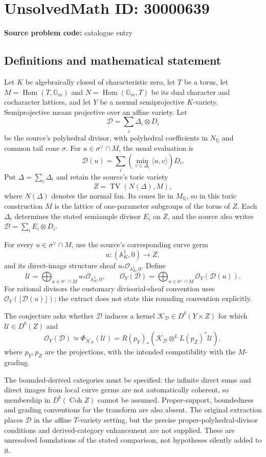 \documentclass[11pt]{article}
\newcommand{\Q}{\mathbb{Q}}
\begin{document}
\section*{UnsolvedMath ID: 30000639}
\textbf{Source problem code:} catalogue entry
\subsection{Definitions and mathematical statement}
Let $K$ be algebraically closed of characteristic zero, let $T$ be a torus, let $M=\operatorname{Hom}(T,\mathbb G_m)$ and $N=\operatorname{Hom}(\mathbb G_m,T)$ be its dual character and cocharacter lattices, and let $Y$ be a normal semiprojective $K$-variety. Semiprojective means projective over an affine variety. Let
\[
\mathcal D=\sum_i\Delta_i\otimes D_i
\]
be the source's polyhedral divisor, with polyhedral coefficients in $N_{\Q}$ and common tail cone $\sigma$. For $u\in\sigma^\vee\cap M$, the usual evaluation is
\[
\mathcal D(u)=\sum_i\left(\min_{v\in\Delta_i}\langle u,v\rangle\right)D_i.
\]
Put $\Delta=\sum_i\Delta_i$ and retain the source's toric variety
\[
Z=\operatorname{TV}(N(\Delta),M),
\]
where $N(\Delta)$ denotes the normal fan. Its cones lie in $M_{\Q}$, so in this toric construction $M$ is the lattice of one-parameter subgroups of the torus of $Z$. Each $\Delta_i$ determines the stated semiample divisor $E_i$ on $Z$, and the source also writes $\mathcal D=\sum_i E_i\otimes D_i$.

For every $u\in\sigma^\vee\cap M$, use the source's corresponding curve germ
\[
u:(\mathbb A^1_K,0)\longrightarrow Z,
\]
and its direct-image structure sheaf $u_*\mathcal O_{\mathbb A^1_K,0}$. Define
\[
\mathcal U=\bigoplus_{u\in\sigma^\vee\cap M}u_*\mathcal O_{\mathbb A^1_K,0},
\qquad
\mathcal O_Y(\mathcal D)=\bigoplus_{u\in\sigma^\vee\cap M}\mathcal O_Y(\mathcal D(u)).
\]
For rational divisors the customary divisorial-sheaf convention uses $\mathcal O_Y(\lfloor\mathcal D(u)\rfloor)$; the extract does not state this rounding convention explicitly.

The conjecture asks whether $\mathcal D$ induces a kernel $\mathcal K_{\mathcal D}\in D^b(Y\times Z)$ for which $\mathcal U\in D^b(Z)$ and
\[
\mathcal O_Y(\mathcal D)\simeq
\Phi_{\mathcal K_{\mathcal D}}(\mathcal U)
=R(p_Y)_*\left(\mathcal K_{\mathcal D}\otimes^{L}L(p_Z)^*\mathcal U\right),
\]
where $p_Y,p_Z$ are the projections, with the intended compatibility with the $M$-grading.

The bounded-derived categories must be specified: the infinite direct sums and direct images from local curve germs are not automatically coherent, so membership in $D^b(\operatorname{Coh}Z)$ cannot be assumed. Proper-support, boundedness and grading conventions for the transform are also absent. The original extraction places $\mathcal D$ in the affine $T$-variety setting, but the precise proper-polyhedral-divisor conditions and derived-category enhancement are not supplied. These are unresolved foundations of the stated comparison, not hypotheses silently added to it.
\end{document}
